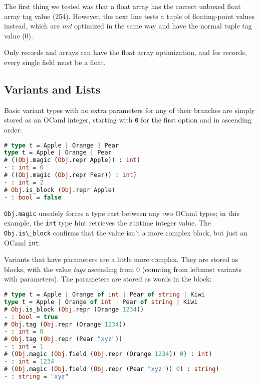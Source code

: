 The first thing we tested was that a float array has the correct unboxed
float array tag value (254). However, the next line tests a tuple of
floating-point values instead, which are \emph{not} optimized in the
same way and have the normal tuple tag value (0).

Only records and arrays can have the float array optimization, and for
records, every single field must be a float.

\hypertarget{variants-and-lists}{%
\subsection{Variants and Lists}\label{variants-and-lists}}

Basic variant types with no extra parameters for any of their branches
are simply stored as an OCaml integer, starting with
\passthrough{\lstinline!0!} for the first option and in ascending order:

\begin{lstlisting}[language=Caml]
# type t = Apple | Orange | Pear
type t = Apple | Orange | Pear
# ((Obj.magic (Obj.repr Apple)) : int)
- : int = 0
# ((Obj.magic (Obj.repr Pear)) : int)
- : int = 2
# Obj.is_block (Obj.repr Apple)
- : bool = false
\end{lstlisting}

\passthrough{\lstinline!Obj.magic!} unsafely forces a type cast between
any two OCaml types; in this example, the \passthrough{\lstinline!int!}
type hint retrieves the runtime integer value. The
\passthrough{\lstinline!Obj.is\_block!} confirms that the value isn't a
more complex block, but just an OCaml \passthrough{\lstinline!int!}.

Variants that have parameters are a little more complex. They are stored
as blocks, with the value \emph{tags} ascending from 0 (counting from
leftmost variants with parameters). The parameters are stored as words
in the block:

\begin{lstlisting}[language=Caml]
# type t = Apple | Orange of int | Pear of string | Kiwi
type t = Apple | Orange of int | Pear of string | Kiwi
# Obj.is_block (Obj.repr (Orange 1234))
- : bool = true
# Obj.tag (Obj.repr (Orange 1234))
- : int = 0
# Obj.tag (Obj.repr (Pear "xyz"))
- : int = 1
# (Obj.magic (Obj.field (Obj.repr (Orange 1234)) 0) : int)
- : int = 1234
# (Obj.magic (Obj.field (Obj.repr (Pear "xyz")) 0) : string)
- : string = "xyz"
\end{lstlisting}

